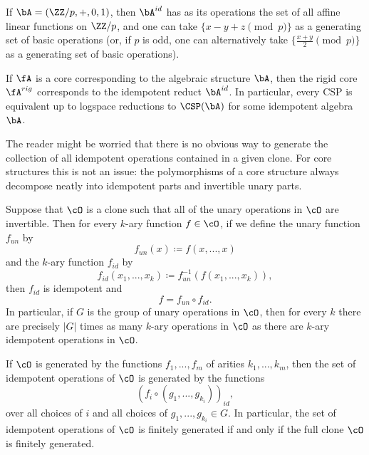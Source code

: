 \begin{ex} If $\bA = (\ZZ/p, +, 0, 1)$, then $\bA^{id}$ has as its operations the set of all affine linear functions on $\ZZ/p$, and one can take $\{x-y+z \pmod{p}\}$ as a generating set of basic operations (or, if $p$ is odd, one can alternatively take $\{\frac{x+y}{2} \pmod{p}\}$ as a generating set of basic operations).
\end{ex}

\begin{prop} If $\fA$ is a core corresponding to the algebraic structure $\bA$, then the rigid core $\fA^{rig}$ corresponds to the idempotent reduct $\bA^{id}$. In particular, every CSP is equivalent up to logspace reductions to $\CSP(\bA)$ for some idempotent algebra $\bA$.
\end{prop}

The reader might be worried that there is no obvious way to generate the collection of all idempotent operations contained in a given clone. For core structures this is not an issue: the polymorphisms of a core structure always decompose neatly into idempotent parts and invertible unary parts.

\begin{prop} Suppose that $\cO$ is a clone such that all of the unary operations in $\cO$ are invertible. Then for every $k$-ary function $f \in \cO$, if we define the unary function $f_{un}$ by
\[
f_{un}(x) \coloneqq f(x,...,x)
\]
and the $k$-ary function $f_{id}$ by
\[
f_{id}(x_1,...,x_k) \coloneqq f_{un}^{-1}(f(x_1, ..., x_k)),
\]
then $f_{id}$ is idempotent and
\[
f = f_{un} \circ f_{id}.
\]
In particular, if $G$ is the group of unary operations in $\cO$, then for every $k$ there are precisely $|G|$ times as many $k$-ary operations in $\cO$ as there are $k$-ary idempotent operations in $\cO$.

If $\cO$ is generated by the functions $f_1, ..., f_m$ of arities $k_1, ..., k_m$, then the set of idempotent operations of $\cO$ is generated by the functions
\[
(f_i \circ (g_{1}, ..., g_{k_i}))_{id},
\]
over all choices of $i$ and all choices of $g_1, ..., g_{k_i} \in G$. In particular, the set of idempotent operations of $\cO$ is finitely generated if and only if the full clone $\cO$ is finitely generated.
\end{prop}

